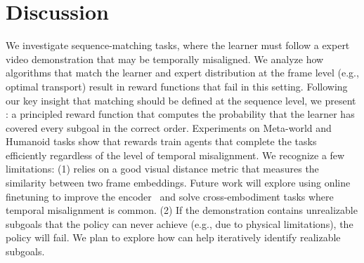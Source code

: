 \section{Discussion}
We investigate sequence-matching tasks, where the learner must follow a expert video demonstration that may be temporally misaligned. 
We analyze how algorithms that match the learner and expert distribution at the frame level (e.g., optimal transport) result in reward functions that fail in this setting.
Following our key insight that matching should be defined at the sequence level, we present \orca{}: a principled reward function that computes the probability that the learner has covered every subgoal in the correct order. 
Experiments on Meta-world and Humanoid tasks show that \orca{} rewards train agents that complete the tasks efficiently regardless of the level of temporal misalignment.
We recognize a few limitations: (1) \orca{} relies on a good visual distance metric that measures the similarity between two frame embeddings. Future work will explore using online finetuning to improve the encoder~\cite{fu2024furlvisuallanguagemodelsfuzzy} and solve cross-embodiment tasks where temporal misalignment is common. (2) If the demonstration contains unrealizable subgoals that the policy can never achieve (e.g., due to physical limitations), the policy will fail. We plan to explore how \orca{} can help iteratively identify realizable subgoals.


